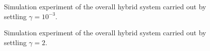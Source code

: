 %
%
%
\begin{figure}[t]
    \centering
    \subfigure[{\footnotesize Time evolution of the states $x = [\xi,\dot{\xi}]^\top$.}]{}
    \vspace{-5mm}
    \caption{\footnotesize Simulation experiment of the overall hybrid system carried out by settling $\gamma = 10^{-3}$. %
	}
    \label{fig:exp1}
\end{figure}
\begin{figure}[t]
	\centering
	\subfigure[{\footnotesize Time evolution of the states $x = [\xi,\dot{\xi}]^\top$.}]{}
	\vspace{-5mm}
	\caption{\footnotesize Simulation experiment of the overall hybrid system carried out by settling $\gamma = 2$. %
	}
	\label{fig:exp2}
\end{figure}
%
%
%	
